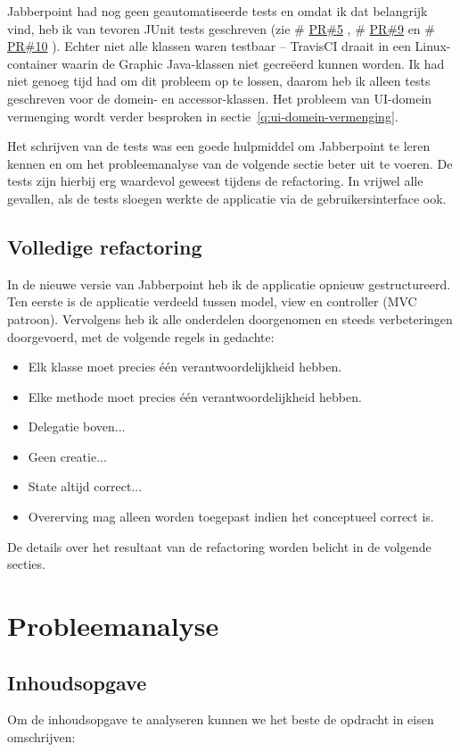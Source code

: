 \documentclass[a4paper]{article}
\makeatletter
\newcommand*{\repo}{\begingroup\@makeother\#\@repo}
\newcommand*{\@repo}[2]{%
  \href{https://github.com/DanielSchiavini/design-patterns-assignment/#1}{#2}%
  \endgroup}
\newcommand{\PR}[1]{\repo{pull/#1}{PR\##1}}
\makeatother
\begin{document}
    Jabberpoint had nog geen geautomatiseerde tests en omdat ik dat belangrijk vind, heb ik van tevoren JUnit tests geschreven (zie \PR{5}, \PR{9} en \PR{10}).
    Echter niet alle klassen waren testbaar -- TravisCI draait in een Linux-container waarin de Graphic Java-klassen niet gecreëerd kunnen worden.
    Ik had niet genoeg tijd had om dit probleem op te lossen, daarom heb ik alleen tests geschreven voor de domein- en accessor-klassen.
    Het probleem van UI-domein vermenging wordt verder besproken in sectie~\ref{q:ui-domein-vermenging}.

    Het schrijven van de tests was een goede hulpmiddel om Jabberpoint te leren kennen en om het probleemanalyse van de volgende sectie beter uit te voeren.
	De tests zijn hierbij erg waardevol geweest tijdens de refactoring.
	In vrijwel alle gevallen, als de tests sloegen werkte de applicatie via de gebruikersinterface ook.

	\subsection*{Volledige refactoring}
	In de nieuwe versie van Jabberpoint heb ik de applicatie opnieuw gestructureerd.
	Ten eerste is de applicatie verdeeld tussen model, view en controller (MVC patroon).
	Vervolgens heb ik alle onderdelen doorgenomen en steeds verbeteringen doorgevoerd, met de volgende regels in gedachte:
	\begin{itemize}
		\item Elk klasse moet precies één verantwoordelijkheid hebben.
		\item Elke methode moet precies één verantwoordelijkheid hebben.
		\item Delegatie boven...
		\item Geen creatie...
		\item State altijd correct...
		\item Overerving mag alleen worden toegepast indien het conceptueel correct is.
	\end{itemize}

	De details over het resultaat van de refactoring worden belicht in de volgende secties.

\section{Probleemanalyse}
    \label{sec:probleemanalyse}

	\subsection{Inhoudsopgave}
    Om de inhoudsopgave te analyseren kunnen we het beste de opdracht in eisen omschrijven:
\end{document}

